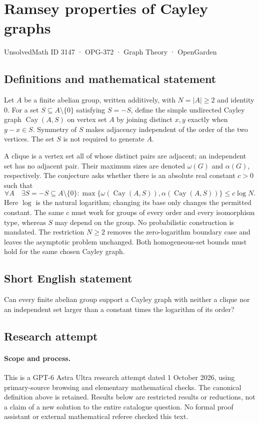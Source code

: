 \documentclass[11pt,a4paper]{article}
\begin{document}
\section*{Ramsey properties of Cayley graphs}\label{3147}
{\small UnsolvedMath ID 3147 · OPG-372 · Graph Theory · OpenGarden}
\subsection{Definitions and mathematical statement}
Let $A$ be a finite abelian group, written additively, with
$N=|A|\geq2$ and identity $0$. For a set
$S\subseteq A\setminus\{0\}$ satisfying $S=-S$, define the simple
undirected Cayley graph $\operatorname{Cay}(A,S)$ on vertex set $A$
by joining distinct $x,y$ exactly when $y-x\in S$. Symmetry of $S$
makes adjacency independent of the order of the two vertices.
The set $S$ is not required to generate $A$.

A clique is a vertex set all of whose distinct pairs are adjacent;
an independent set has no adjacent pair. Their maximum sizes are
denoted $\omega(G)$ and $\alpha(G)$, respectively. The conjecture
asks whether there is an absolute real constant $c>0$ such that
\[
 \forall A\quad\exists S=-S\subseteq A\setminus\{0\}:
 \max\{\omega(\operatorname{Cay}(A,S)),
        \alpha(\operatorname{Cay}(A,S))\}\leq c\log N.
\]
Here $\log$ is the natural logarithm; changing its base only changes
the permitted constant. The same $c$ must work for groups of every
order and every isomorphism type, whereas $S$ may depend on the
group. No probabilistic construction is mandated. The restriction
$N\geq2$ removes the zero-logarithm boundary case and leaves the
asymptotic problem unchanged. Both homogeneous-set bounds must hold
for the same chosen Cayley graph.
\subsection{Short English statement}
Can every finite abelian group support a Cayley graph with neither a clique nor an independent set larger than a constant times the logarithm of its order?
\subsection{Research attempt}
\paragraph{Scope and process.}
This is a GPT-6 Astra Ultra research attempt dated 1 October 2026, using
primary-source browsing and elementary mathematical checks. The canonical
definition above is retained. Results below are restricted results or
reductions, not a claim of a new solution to the entire catalogue question.
No formal proof assistant or external mathematical referee checked this text.
\end{document}
